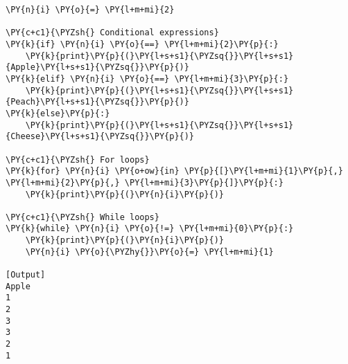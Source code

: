 \begin{Verbatim}[label=\makebox{\url{https://github.com/lucabaldini/cmepda/tree/master/slides/latex/snippets/control\_flow.py}},commandchars=\\\{\}]
\PY{n}{i} \PY{o}{=} \PY{l+m+mi}{2}

\PY{c+c1}{\PYZsh{} Conditional expressions}
\PY{k}{if} \PY{n}{i} \PY{o}{==} \PY{l+m+mi}{2}\PY{p}{:}
    \PY{k}{print}\PY{p}{(}\PY{l+s+s1}{\PYZsq{}}\PY{l+s+s1}{Apple}\PY{l+s+s1}{\PYZsq{}}\PY{p}{)}
\PY{k}{elif} \PY{n}{i} \PY{o}{==} \PY{l+m+mi}{3}\PY{p}{:}
    \PY{k}{print}\PY{p}{(}\PY{l+s+s1}{\PYZsq{}}\PY{l+s+s1}{Peach}\PY{l+s+s1}{\PYZsq{}}\PY{p}{)}
\PY{k}{else}\PY{p}{:}
    \PY{k}{print}\PY{p}{(}\PY{l+s+s1}{\PYZsq{}}\PY{l+s+s1}{Cheese}\PY{l+s+s1}{\PYZsq{}}\PY{p}{)}

\PY{c+c1}{\PYZsh{} For loops}
\PY{k}{for} \PY{n}{i} \PY{o+ow}{in} \PY{p}{[}\PY{l+m+mi}{1}\PY{p}{,} \PY{l+m+mi}{2}\PY{p}{,} \PY{l+m+mi}{3}\PY{p}{]}\PY{p}{:}
    \PY{k}{print}\PY{p}{(}\PY{n}{i}\PY{p}{)}

\PY{c+c1}{\PYZsh{} While loops}
\PY{k}{while} \PY{n}{i} \PY{o}{!=} \PY{l+m+mi}{0}\PY{p}{:}
    \PY{k}{print}\PY{p}{(}\PY{n}{i}\PY{p}{)}
    \PY{n}{i} \PY{o}{\PYZhy{}}\PY{o}{=} \PY{l+m+mi}{1}

[Output]
Apple
1
2
3
3
2
1
\end{Verbatim}